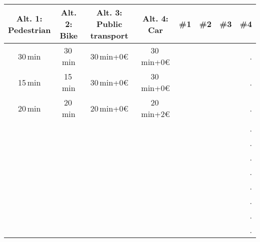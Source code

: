 \documentclass{article}
\begin{document}

\vspace{1em}

\begin{center}
{\huge
\begin{tabular}{|c|c|c|c||r|r|r|r|}
\hline 
  \myBox{3em}{Alt. 1:\\Pe\-des\-tri\-an} &
  \myBox{3em}{Alt. 2:\\Bike} &
  \myBox{3em}{Alt. 3:\\ Public transport} &
  \myBox{3em}{Alt. 4:\\ Car} &
  \#1 & \#2 & \#3 & \#4 \\ \hline\hline
30\,min & 30\,min & 30\,min+0\euro{} & 30\,min+0\euro{} &&&&. \\[0.5em] \hline
15\,min & 15\,min & 30\,min+0\euro{} & 30\,min+0\euro{} &&&&. \\[0.5em] \hline
20\,min & 20\,min & 20\,min+0\euro{} & 20\,min+2\euro{} &&&&. \\[0.5em] \hline
&&&&&&&. \\[0.5em]\hline
&&&&&&&. \\[0.5em]\hline
&&&&&&&. \\[0.5em]\hline
&&&&&&&. \\[0.5em]\hline
&&&&&&&. \\[0.5em]\hline
&&&&&&&. \\[0.5em]\hline
&&&&&&&. \\[0.5em]\hline
&&&&&&&. \\[0.5em]\hline
\end{tabular}
}
\end{center}
\end{document}
